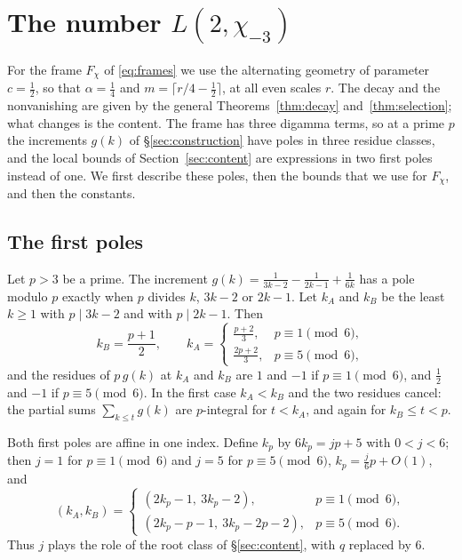 \documentclass[11pt]{amsart}
\theoremstyle{definition}
\theoremstyle{remark}
\numberwithin{equation}{section}
\begin{document}
\section{The number \texorpdfstring{$L(2,\chi_{-3})$}{L(2,chi-3)}}
\label{sec:chi3-quarter}

For the frame $F_\chi$ of \eqref{eq:frames} we use the alternating geometry of parameter $c=\frac12$, so that
$\alpha=\frac14$ and $m=\lceil r/4-\frac12\rceil$, at all even scales $r$. The decay and the nonvanishing are given by the
general Theorems~\ref{thm:decay} and~\ref{thm:selection}; what changes is the content. The frame has three digamma terms,
so at a prime $p$ the increments $g(k)$ of \S\ref{sec:construction} have poles in three residue classes, and the local
bounds of Section~\ref{sec:content} are expressions in two first poles instead of one. We first describe these poles, then
the bounds that we use for $F_\chi$, and then the constants.

\subsection{The first poles}
Let $p>3$ be a prime. The increment $g(k)=\frac1{3k-2}-\frac1{2k-1}+\frac1{6k}$ has a pole modulo $p$ exactly when $p$
divides $k$, $3k-2$ or $2k-1$. Let $k_A$ and $k_B$ be the least $k\ge1$ with $p\mid3k-2$ and with $p\mid2k-1$. Then
\[
 k_B=\frac{p+1}2,\qquad
 k_A=\begin{cases}\frac{p+2}3,&p\equiv1\pmod6,\\[3pt]\frac{2p+2}3,&p\equiv5\pmod6,\end{cases}
\]
and the residues of $p\,g(k)$ at $k_A$ and $k_B$ are $1$ and $-1$ if $p\equiv1\pmod6$, and $\frac12$ and $-1$ if
$p\equiv5\pmod6$. In the first case $k_A<k_B$ and the two residues cancel: the partial sums $\sum_{k\le t}g(k)$ are
$p$-integral for $t<k_A$, and again for $k_B\le t<p$.

Both first poles are affine in one index. Define $k_p$ by $6k_p=jp+5$ with $0<j<6$; then $j=1$ for $p\equiv1\pmod6$
and $j=5$ for $p\equiv5\pmod6$, $k_p=\frac j6p+O(1)$, and
\[
 (k_A,k_B)=\begin{cases}(2k_p-1,\ 3k_p-2),&p\equiv1\pmod6,\\[2pt](2k_p-p-1,\ 3k_p-2p-2),&p\equiv5\pmod6.\end{cases}
\]
Thus $j$ plays the role of the root class of \S\ref{sec:content}, with $q$ replaced by $6$.
\end{document}
